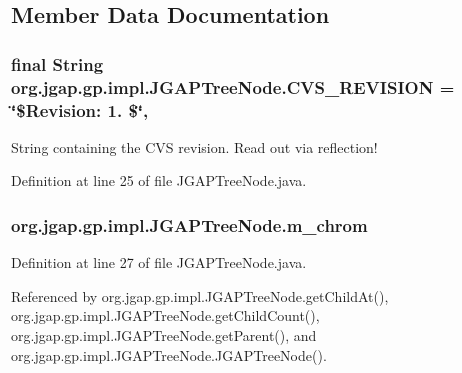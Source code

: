 \subsection{Member Data Documentation}
\hypertarget{classorg_1_1jgap_1_1gp_1_1impl_1_1_j_g_a_p_tree_node_af2c98e773c64700b0dbdd00e4640ddbf}{
\subsubsection[{C\-V\-S\-\_\-\-R\-E\-V\-I\-S\-I\-O\-N}]{\setlength{\rightskip}{0pt plus 5cm}final String org.\-jgap.\-gp.\-impl.\-J\-G\-A\-P\-Tree\-Node.\-C\-V\-S\-\_\-\-R\-E\-V\-I\-S\-I\-O\-N = \char`\"{}\$Revision\-: 1. \$\char`\"{}\hspace{0.3cm}{\ttfamily [static]}, {\ttfamily [private]}}}\label{classorg_1_1jgap_1_1gp_1_1impl_1_1_j_g_a_p_tree_node_af2c98e773c64700b0dbdd00e4640ddbf}
String containing the C\-V\-S revision. Read out via reflection! 

Definition at line 25 of file J\-G\-A\-P\-Tree\-Node.\-java.

\hypertarget{classorg_1_1jgap_1_1gp_1_1impl_1_1_j_g_a_p_tree_node_ac053f002a5d10b9a0db8a44b5f6f8fb2}{
\subsubsection[{m\-\_\-chrom}]{ org.\-jgap.\-gp.\-impl.\-J\-G\-A\-P\-Tree\-Node.\-m\-\_\-chrom\hspace{0.3cm}{\ttfamily [private]}}}\label{classorg_1_1jgap_1_1gp_1_1impl_1_1_j_g_a_p_tree_node_ac053f002a5d10b9a0db8a44b5f6f8fb2}


Definition at line 27 of file J\-G\-A\-P\-Tree\-Node.\-java.



Referenced by org.\-jgap.\-gp.\-impl.\-J\-G\-A\-P\-Tree\-Node.\-get\-Child\-At(), org.\-jgap.\-gp.\-impl.\-J\-G\-A\-P\-Tree\-Node.\-get\-Child\-Count(), org.\-jgap.\-gp.\-impl.\-J\-G\-A\-P\-Tree\-Node.\-get\-Parent(), and org.\-jgap.\-gp.\-impl.\-J\-G\-A\-P\-Tree\-Node.\-J\-G\-A\-P\-Tree\-Node().

